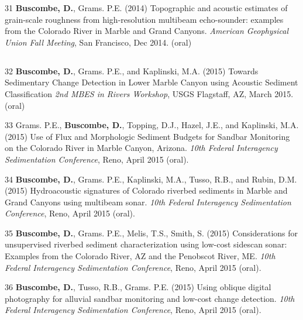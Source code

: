 \documentclass[margin,line]{resume}
\begin{document}
\begin{resume}
\begin{footnotesize}
\begin{list1}
        \item[31] {\bf Buscombe, D.}, Grams. P.E. (2014) Topographic and acoustic estimates of grain-scale roughness from high-resolution multibeam echo-sounder: examples from the Colorado River in Marble and Grand Canyons. {\sl American Geophysical Union Fall Meeting}, San Francisco, Dec 2014. (oral)
	\end{list1}

	\subsection{}
	\begin{list1}
	
        \item[32] {\bf Buscombe, D.}, Grams. P.E., and Kaplinski, M.A. (2015) Towards Sedimentary Change Detection in Lower Marble Canyon using Acoustic Sediment Classification {\sl 2nd MBES in Rivers Workshop}, USGS Flagstaff, AZ, March 2015. (oral)\\
        
        \item[33] Grams. P.E., {\bf Buscombe, D.}, Topping, D.J., Hazel, J.E., and Kaplinski, M.A. (2015) Use of Flux and Morphologic Sediment Budgets for Sandbar Monitoring on the Colorado River in Marble Canyon, Arizona. {\sl 10th Federal Interagency Sedimentation Conference}, Reno, April 2015 (oral).\\

        \item[34] {\bf Buscombe, D.}, Grams. P.E., Kaplinski, M.A., Tusso, R.B., and Rubin, D.M. (2015) Hydroacoustic signatures of Colorado riverbed sediments in Marble and Grand Canyons using multibeam sonar. {\sl 10th Federal Interagency Sedimentation Conference}, Reno, April 2015 (oral).\\

        \item[35] {\bf Buscombe, D.}, Grams. P.E., Melis, T.S., Smith, S. (2015) Considerations for unsupervised riverbed sediment characterization using low-cost sidescan sonar: Examples from the Colorado River, AZ and the Penobscot River, ME. {\sl 10th Federal Interagency Sedimentation Conference}, Reno, April 2015 (oral).\\

        \item[36] {\bf Buscombe, D.}, Tusso, R.B., Grams. P.E. (2015) Using oblique digital photography for alluvial sandbar monitoring and low-cost change detection. {\sl 10th Federal Interagency Sedimentation Conference}, Reno, April 2015 (oral).


\end{list1}
\end{footnotesize}
\end{resume}
\end{document}
